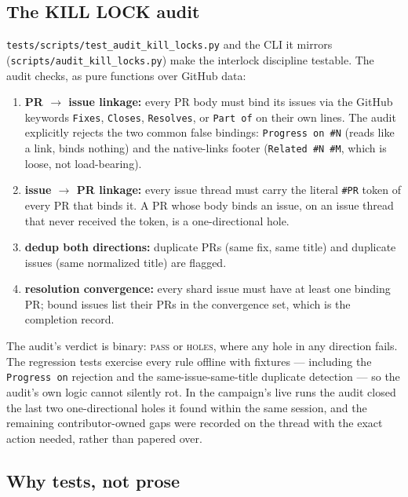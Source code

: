 \documentclass[11pt]{article}
\theoremstyle{definition}
\theoremstyle{plain}
\theoremstyle{remark}
\begin{document}
\subsection{The KILL LOCK audit}

\texttt{tests/scripts/test\_audit\_kill\_locks.py} and the CLI it mirrors
(\texttt{scripts/audit\_kill\_locks.py}) make the interlock discipline
testable. The audit checks, as pure functions over GitHub data:

\begin{enumerate}[leftmargin=*]
\item \textbf{PR $\rightarrow$ issue linkage:} every PR body must bind its
  issues via the GitHub keywords \texttt{Fixes}, \texttt{Closes},
  \texttt{Resolves}, or \texttt{Part of} on their own lines. The audit
  explicitly rejects the two common false bindings: \texttt{Progress on \#N}
  (reads like a link, binds nothing) and the native-links footer
  (\texttt{Related \#N \#M}, which is loose, not load-bearing).
\item \textbf{issue $\rightarrow$ PR linkage:} every issue thread must carry
  the literal \texttt{\#PR} token of every PR that binds it. A PR whose body
  binds an issue, on an issue thread that never received the token, is a
  one-directional hole.
\item \textbf{dedup both directions:} duplicate PRs (same fix, same title)
  and duplicate issues (same normalized title) are flagged.
\item \textbf{resolution convergence:} every shard issue must have at least
  one binding PR; bound issues list their PRs in the convergence set, which
  is the completion record.
\end{enumerate}

The audit's verdict is binary: \textsc{pass} or \textsc{holes}, where any
hole in any direction fails. The regression tests exercise every rule offline
with fixtures --- including the \texttt{Progress on} rejection and the
same-issue-same-title duplicate detection --- so the audit's own logic cannot
silently rot. In the campaign's live runs the audit closed the last two
one-directional holes it found within the same session, and the remaining
contributor-owned gaps were recorded on the thread with the exact action
needed, rather than papered over.

\subsection{Why tests, not prose}
\end{document}
